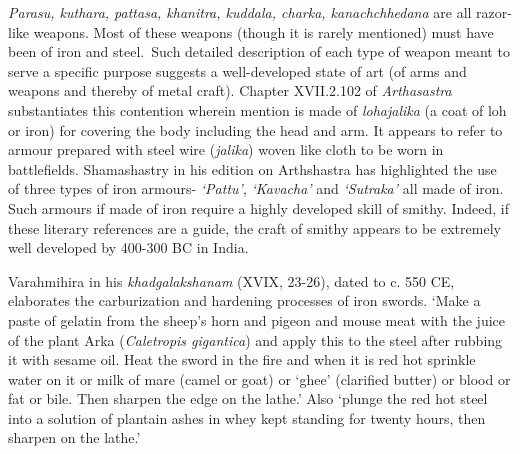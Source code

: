 {\it Parasu, kuthara, pattasa, khanitra, kuddala, charka, kanachchhedana}  are all razor-like weapons. Most of these weapons (though it is rarely mentioned) must have been of iron and steel.~Such detailed description of each type of weapon meant to serve a specific purpose suggests a well-developed state of art (of arms and weapons and thereby of metal craft). Chapter XVII.2.102 of {\it Arthasastra} substantiates this contention wherein mention is made of {\it lohajalika} (a coat of loh or iron) for covering the body including the head and arm. It appears to refer to armour prepared with steel wire ({\it jalika}) woven like cloth to be worn in battlefields. Shamashastry in his edition on Arthshastra has highlighted the use of three types of iron armours- {\it ‘Pattu’}, {\it ‘Kavacha’} and {\it ‘Sutraka’} all made of iron. Such armours if made of iron require a highly developed skill of smithy. Indeed, if these literary references are a guide, the craft of smithy appears to be extremely well developed by 400-300 BC in India.

Varahmihira in his {\it khadgalakshanam} (XVIX, 23-26), dated to c. 550 CE, elaborates the carburization and hardening processes of iron swords. ‘Make a paste of gelatin from the sheep’s horn and pigeon and mouse meat with the juice of the plant Arka ({\it Caletropis gigantica}) and apply this to the steel after rubbing it with sesame oil. Heat the sword in the fire and when it is red hot sprinkle water on it or milk of mare (camel or goat) or ‘ghee’ (clarified butter) or blood or fat or bile. Then sharpen the edge on the lathe.’ Also ‘plunge the red hot steel into a solution of plantain ashes in whey kept standing for twenty hours, then sharpen on the lathe.’ 


